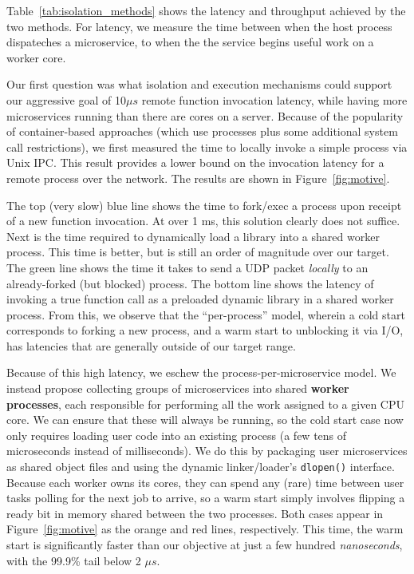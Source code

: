 Table~\ref{tab:isolation_methods} shows the latency and throughput achieved
by the two methods. For latency, we measure the time between when the host
process dispateches a microservice, to when the the service begins useful
work on a worker core.

Our first question was what isolation and execution mechanisms could support
our aggressive goal of 10$\mu{}s$ remote function invocation latency, while
having more microservices running than there are cores on a server.
Because of the popularity of container-based approaches (which use processes
plus some additional system call restrictions), we first measured the time
to locally invoke a simple process via Unix IPC.  This result provides
a lower bound on the invocation latency for a remote process over the network.
The results are shown in Figure~\ref{fig:motive}.

The top (very slow) blue line shows the time to fork/exec a process upon receipt
of a new function invocation.  At over 1 ms, this solution clearly does not
suffice.  Next is the time required to dynamically load a library into a shared
worker process.  This time is better, but is still an order of magnitude over
our target.  The green line shows the time it takes to send a UDP packet
\emph{locally} to an already-forked (but blocked) process.  The bottom
line shows the latency of invoking a true function call as a preloaded dynamic
library in a shared worker process.  From this, we observe that the
``per-process'' model, wherein a cold start corresponds to forking a new
process, and a warm start to unblocking it via I/O, has latencies that are
generally outside of our target range.

Because of this high latency, we eschew the process-per-microservice model.
We instead propose
collecting groups of microservices into shared \textbf{worker processes},
each responsible for performing all the work assigned to a given CPU core.  We can
ensure that these will always be running, so the cold start case now only requires
loading user code into an existing process (a few tens of microseconds instead
of milliseconds).  We do this by packaging user
microservices as shared object files and using the dynamic linker/loader's
\texttt{dlopen()} interface.  Because each worker owns its cores, they can spend any
(rare) time between user tasks polling for the next job to arrive, so a warm start
simply involves flipping a ready bit in memory shared between the two processes.
Both cases appear in Figure~\ref{fig:motive} as the orange and red lines,
respectively.  This time, the warm start is significantly faster than our objective
at just a few hundred \textit{nanoseconds}, with the 99.9\% tail below 2
$\mu{}s$.

